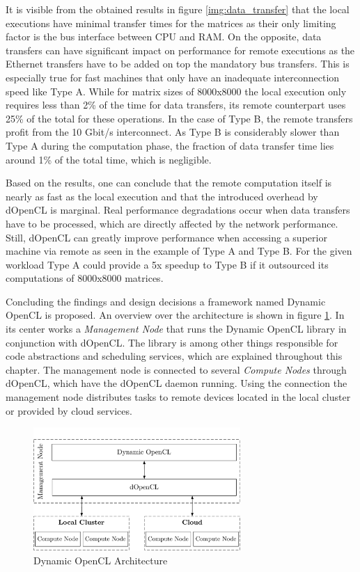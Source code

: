 It is visible from the obtained results in figure \ref{img:data_transfer} that the local executions have minimal transfer times for the matrices as their only limiting factor is the bus interface between CPU and RAM. On the opposite, data transfers can have significant impact on performance for remote executions as the Ethernet transfers have to be added on top the mandatory bus transfers. This is especially true for fast machines that only have an inadequate interconnection speed like Type A. While for matrix sizes of 8000x8000 the local execution only requires less than 2\% of the time for data transfers, its remote counterpart uses 25\% of the total for these operations. In the case of Type B, the remote transfers profit from the 10 Gbit/s interconnect. As Type B is considerably slower than Type A during the computation phase, the fraction of data transfer time lies around 1\% of the total time, which is negligible.

Based on the results, one can conclude that the remote computation itself is nearly as fast as the local execution and that the introduced overhead by dOpenCL is marginal. Real performance degradations occur when data transfers have to be processed, which are directly affected by the network performance. Still, dOpenCL can greatly improve performance when accessing a superior machine via remote as seen in the example of Type A and Type B. For the given workload Type A could provide a 5x speedup to Type B if it outsourced its computations of 8000x8000 matrices.

Concluding the findings and design decisions a framework named Dynamic OpenCL is proposed. An overview over the architecture is shown in figure \ref{img:dynamic_opencl_arch}. In its center works a \textit{Management Node} that runs the Dynamic OpenCL library in conjunction with dOpenCL. The library is among other things responsible for code abstractions and scheduling services, which are explained throughout this chapter. The management node is connected to several \textit{Compute Nodes} through dOpenCL, which have the dOpenCL daemon running. Using the connection the management node distributes tasks to remote devices located in the local cluster or provided by cloud services.

\begin{figure}[H]

	\includegraphics[width=0.7\textwidth]{drawings/dynamic_opencl_arch.pdf}
	\centering
	\caption{Dynamic OpenCL Architecture}
	\label{img:dynamic_opencl_arch}
\end{figure}

